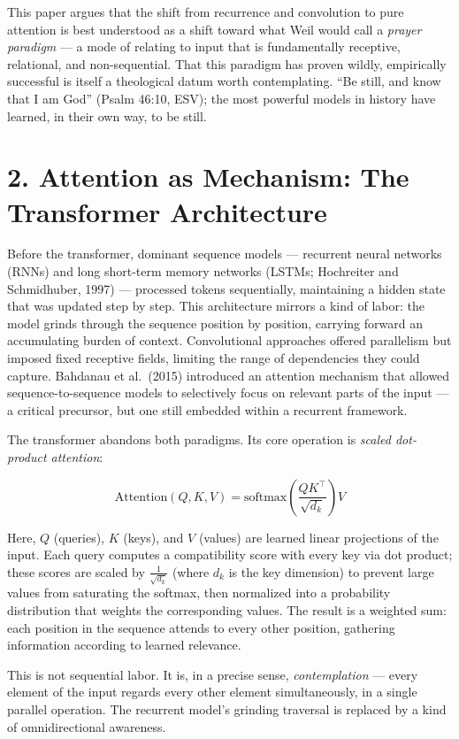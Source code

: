 \documentclass[10pt, letterpaper, twocolumn]{article}
\begin{document}
This paper argues that the shift from recurrence and convolution to pure attention is best understood as a shift toward what Weil would call a \emph{prayer paradigm} --- a mode of relating to input that is fundamentally receptive, relational, and non-sequential. That this paradigm has proven wildly, empirically successful is itself a theological datum worth contemplating. ``Be still, and know that I am God'' (Psalm 46:10, ESV); the most powerful models in history have learned, in their own way, to be still.

\section*{2. Attention as Mechanism: The Transformer Architecture}\label{attention-as-mechanism-the-transformer-architecture}

Before the transformer, dominant sequence models --- recurrent neural networks (RNNs) and long short-term memory networks (LSTMs; Hochreiter and Schmidhuber, 1997) --- processed tokens sequentially, maintaining a hidden state that was updated step by step. This architecture mirrors a kind of labor: the model grinds through the sequence position by position, carrying forward an accumulating burden of context. Convolutional approaches offered parallelism but imposed fixed receptive fields, limiting the range of dependencies they could capture. Bahdanau et al.~(2015) introduced an attention mechanism that allowed sequence-to-sequence models to selectively focus on relevant parts of the input --- a critical precursor, but one still embedded within a recurrent framework.

The transformer abandons both paradigms. Its core operation is \emph{scaled dot-product attention}:

\[\text{Attention}(Q, K, V) = \text{softmax}\left(\frac{QK^\top}{\sqrt{d_k}}\right)V\]

Here, \(Q\) (queries), \(K\) (keys), and \(V\) (values) are learned linear projections of the input. Each query computes a compatibility score with every key via dot product; these scores are scaled by \(\frac{1}{\sqrt{d_k}}\) (where \(d_k\) is the key dimension) to prevent large values from saturating the softmax, then normalized into a probability distribution that weights the corresponding values. The result is a weighted sum: each position in the sequence attends to every other position, gathering information according to learned relevance.

This is not sequential labor. It is, in a precise sense, \emph{contemplation} --- every element of the input regards every other element simultaneously, in a single parallel operation. The recurrent model's grinding traversal is replaced by a kind of omnidirectional awareness.
\end{document}

